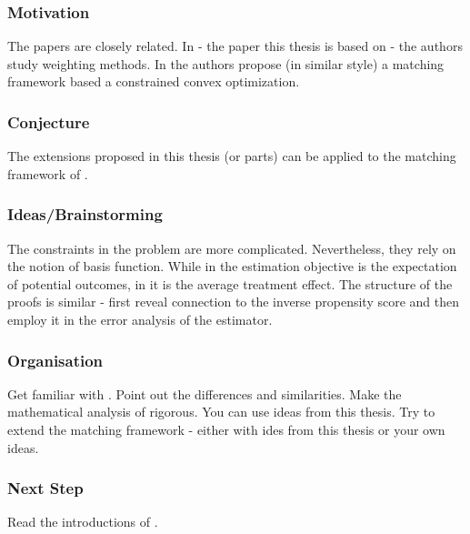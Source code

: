 \subsubsection*{Motivation}
The papers \cite{Wang2019,Wang2023} 
are closely related.
In \cite{Wang2019} - the paper this thesis is based on -
the authors study weighting methods.
In \cite{Wang2023} the authors propose (in similar style) a matching framework based a constrained convex optimization.
\subsubsection{Conjecture}
The extensions proposed in this thesis (or parts) can be applied to the matching framework of \cite{Wang2023}.
\subsubsection{Ideas/Brainstorming}
The constraints in the problem \cite[(2.1)]{Wang2023} are more complicated. Nevertheless, they rely on the notion of basis function.
While in \cite{Wang2019} the estimation objective is the expectation of potential outcomes, in \cite{Wang2023} it is the average treatment effect.
The structure of the proofs is similar - first reveal connection to the inverse propensity score and then employ it in the error analysis of the estimator.
\subsubsection{Organisation}
Get familiar with \cite{Wang2019,Wang2023}. Point out the differences and similarities.
Make the mathematical analysis of \cite{Wang2023} rigorous.
You can use ideas from this thesis.
Try to extend the matching framework - either with ides from this thesis or your own ideas.
\subsubsection{Next Step}
Read the introductions of \cite{Wang2019,Wang2023}. 


